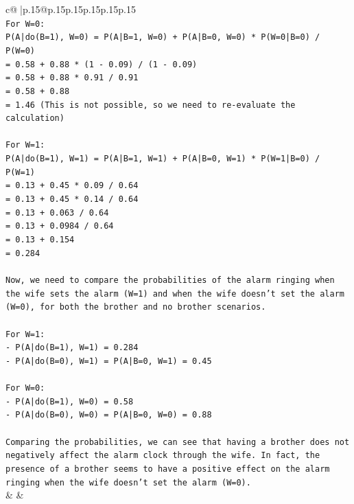 \documentclass{article}
\begin{document}
{\begin{supertabular}{c@{$\;$}|p{.15\linewidth}@{}p{.15\linewidth}p{.15\linewidth}p{.15\linewidth}p{.15\linewidth}p{.15\linewidth}}
{{{\\ 
\texttt{For W=0:} \\
\texttt{P(A|do(B=1), W=0) = P(A|B=1, W=0) + P(A|B=0, W=0) * P(W=0|B=0) / P(W=0)} \\
\texttt{= 0.58 + 0.88 * (1 {-} 0.09) / (1 {-} 0.09)} \\
\texttt{= 0.58 + 0.88 * 0.91 / 0.91} \\
\texttt{= 0.58 + 0.88} \\
\texttt{= 1.46 (This is not possible, so we need to re{-}evaluate the calculation)} \\
\\ 
\texttt{For W=1:} \\
\texttt{P(A|do(B=1), W=1) = P(A|B=1, W=1) + P(A|B=0, W=1) * P(W=1|B=0) / P(W=1)} \\
\texttt{= 0.13 + 0.45 * 0.09 / 0.64} \\
\texttt{= 0.13 + 0.45 * 0.14 / 0.64} \\
\texttt{= 0.13 + 0.063 / 0.64} \\
\texttt{= 0.13 + 0.0984 / 0.64} \\
\texttt{= 0.13 + 0.154} \\
\texttt{= 0.284} \\
\\ 
\texttt{Now, we need to compare the probabilities of the alarm ringing when the wife sets the alarm (W=1) and when the wife doesn't set the alarm (W=0), for both the brother and no brother scenarios.} \\
\\ 
\texttt{For W=1:} \\
\texttt{{-} P(A|do(B=1), W=1) = 0.284} \\
\texttt{{-} P(A|do(B=0), W=1) = P(A|B=0, W=1) = 0.45} \\
\\ 
\texttt{For W=0:} \\
\texttt{{-} P(A|do(B=1), W=0) = 0.58} \\
\texttt{{-} P(A|do(B=0), W=0) = P(A|B=0, W=0) = 0.88} \\
\\ 
\texttt{Comparing the probabilities, we can see that having a brother does not negatively affect the alarm clock through the wife. In fact, the presence of a brother seems to have a positive effect on the alarm ringing when the wife doesn't set the alarm (W=0).} \\
            }
        }
    }
    & & \\ \\


\end{supertabular}}
\end{document}
